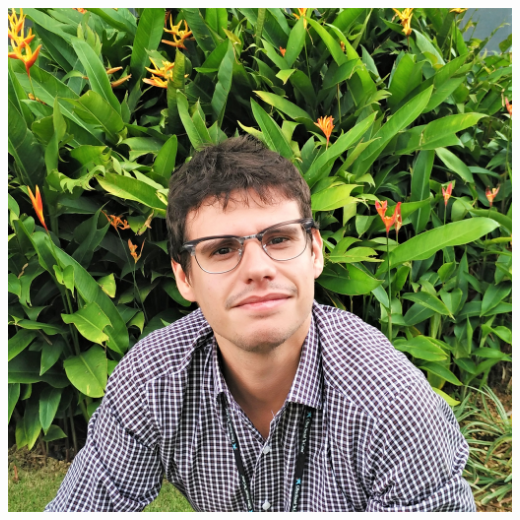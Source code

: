 \documentclass[paper=a4,fontsize=11pt]{temp} %
\begin{document}
\sepspace
\begin{minipage}{.21\linewidth}
   \includegraphics[width=\textwidth]{4}
   \vspace{2pt}
\end{minipage}      
\end{document}
